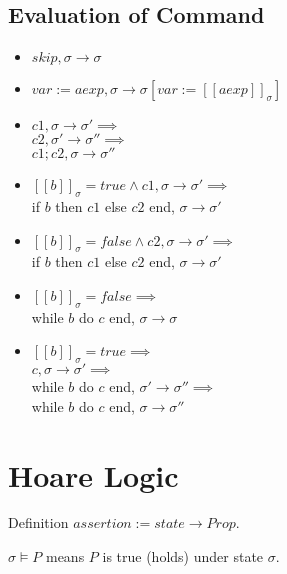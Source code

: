 \documentclass[12pt, fleqn]{article}
\begin{document}
\subsection{Evaluation of Command}
\begin{itemize}
\item %
  $skip, \sigma \rightarrow \sigma$

\item %
  $var := aexp, \sigma \rightarrow \sigma[var := [[aexp]]_\sigma]$

\item %
  $c1, \sigma \rightarrow \sigma' \implies$\\
  $c2, \sigma' \rightarrow \sigma'' \implies$\\
  $c1; c2, \sigma \rightarrow \sigma''$

\item %
  $[[b]]_\sigma = true \land c1, \sigma \rightarrow \sigma' \implies$\\
  if $b$ then $c1$ else $c2$ end, $\sigma \rightarrow \sigma'$

\item %
  $[[b]]_\sigma = false \land c2, \sigma \rightarrow \sigma' \implies$\\
  if $b$ then $c1$ else $c2$ end, $\sigma \rightarrow \sigma'$

\item %
  $[[b]]_\sigma = false \implies$\\
  while $b$ do $c$ end, $\sigma \rightarrow \sigma$

\item %
  $[[b]]_\sigma = true \implies$\\
  $c, \sigma \rightarrow \sigma' \implies$\\
  while $b$ do $c$ end, $\sigma' \rightarrow \sigma'' \implies$\\
  while $b$ do $c$ end, $\sigma \rightarrow \sigma''$
\end{itemize}



\section{Hoare Logic}

Definition $assertion := state \rightarrow Prop$.

$\sigma \models P$ means $P$ is true (holds) under state $\sigma$.
\end{document}
